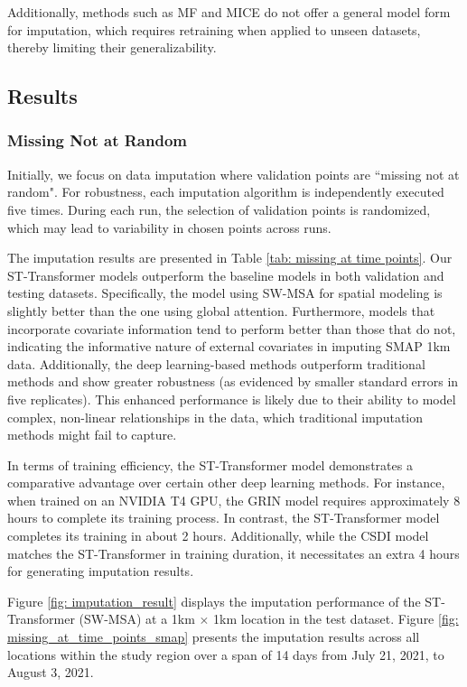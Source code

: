 \documentclass[review]{elsarticle}
\begin{document}
Additionally, methods such as MF and MICE do not offer a general model form for imputation, which requires retraining when applied to unseen datasets, thereby limiting their generalizability.



\subsection{Results}
\subsubsection*{Missing Not at Random}
Initially, we focus on data imputation where validation points are ``missing not at random". For robustness, each imputation algorithm is independently executed five times. During each run, the selection of validation points is randomized, which may lead to variability in chosen points across runs.

The imputation results are presented in Table \ref{tab: missing at time points}. Our ST-Transformer models outperform the baseline models in both validation and testing datasets. Specifically, the model using SW-MSA for spatial modeling is slightly better than the one using global attention. Furthermore, models that incorporate covariate information tend to perform better than those that do not, indicating the informative nature of external covariates in imputing SMAP 1km data. Additionally, the deep learning-based methods outperform traditional methods and show greater robustness (as evidenced by smaller standard errors in five replicates). This enhanced performance is likely due to their ability to model complex, non-linear relationships in the data, which traditional imputation methods might fail to capture. 

In terms of training efficiency, the ST-Transformer model demonstrates a comparative advantage over certain other deep learning methods. For instance, when trained on an NVIDIA T4 GPU, the GRIN model requires approximately 8 hours to complete its training process. In contrast, the ST-Transformer model completes its training in about 2 hours. Additionally, while the CSDI model matches the ST-Transformer in training duration, it necessitates an extra 4 hours for generating imputation results. 

Figure \ref{fig: imputation_result} displays the imputation performance of the ST-Transformer (SW-MSA) at a 1km $\times$ 1km location in the test dataset.  Figure \ref{fig: missing_at_time_points_smap} presents the imputation results across all locations within the study region over a span of 14 days from July 21, 2021, to August 3, 2021.
\end{document}
